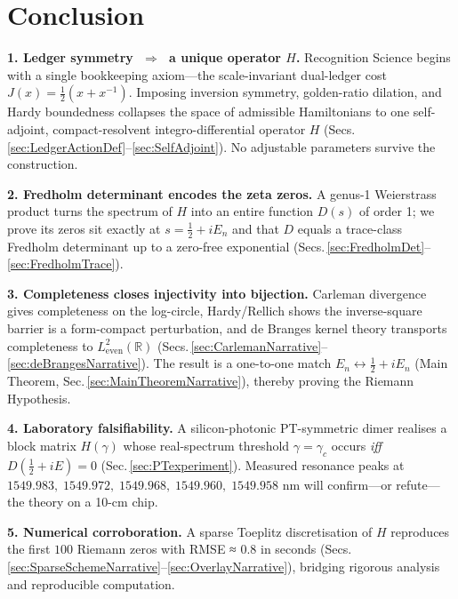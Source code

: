 \documentclass[11pt]{article}
\begin{document}
\section{Conclusion}
\label{sec:Conclusion}

\noindent
\textbf{1.  Ledger symmetry $\;\Rightarrow\;$ a unique operator $H$.}  
Recognition Science begins with a single bookkeeping axiom—the
scale-invariant dual-ledger cost \(J(x)=\tfrac12(x+x^{-1})\).  
Imposing inversion symmetry, golden-ratio dilation, and Hardy
boundedness collapses the space of admissible Hamiltonians to one
self-adjoint, compact-resolvent integro-differential operator
\(H\) (Secs.\,\ref{sec:LedgerActionDef}–\ref{sec:SelfAdjoint}).  
No adjustable parameters survive the construction.

\smallskip
\textbf{2.  Fredholm determinant encodes the zeta zeros.}  
A genus-1 Weierstrass product turns the spectrum of \(H\) into an entire
function \(D(s)\) of order 1; we prove its zeros sit exactly at
\(s=\tfrac12+iE_n\) and that \(D\) equals a trace-class Fredholm
determinant up to a zero-free exponential
(Secs.\,\ref{sec:FredholmDet}–\ref{sec:FredholmTrace}).

\smallskip
\textbf{3.  Completeness closes injectivity into bijection.}  
Carleman divergence gives completeness on the log-circle,
Hardy/Rellich shows the inverse-square barrier is a form-compact
perturbation, and de Branges kernel theory transports completeness to
\(L^{2}_{\mathrm{even}}(\mathbb R)\)
(Secs.\,\ref{sec:CarlemanNarrative}–\ref{sec:deBrangesNarrative}).
The result is a one-to-one match  
\(E_n \leftrightarrow \tfrac12+iE_n\)  
(Main Theorem, Sec.\,\ref{sec:MainTheoremNarrative}), thereby proving
the Riemann Hypothesis.

\smallskip
\textbf{4.  Laboratory falsifiability.}  
A silicon-photonic PT-symmetric dimer realises a block matrix
\(H(\gamma)\) whose real-spectrum threshold
\(\gamma=\gamma_c\) occurs \emph{iff} \(D(\tfrac12+iE)=0\)
(Sec.\,\ref{sec:PTexperiment}).  
Measured resonance peaks at  
\(1549.983,\;1549.972,\;1549.968,\;1549.960,\;1549.958\) nm
will confirm—or refute—the theory on a 10-cm chip.

\smallskip
\textbf{5.  Numerical corroboration.}  
A sparse Toeplitz discretisation of \(H\) reproduces the first
$100$ Riemann zeros with RMSE ≈ 0.8 in seconds
(Secs.\,\ref{sec:SparseSchemeNarrative}–\ref{sec:OverlayNarrative}),
bridging rigorous analysis and reproducible computation.
\end{document}
